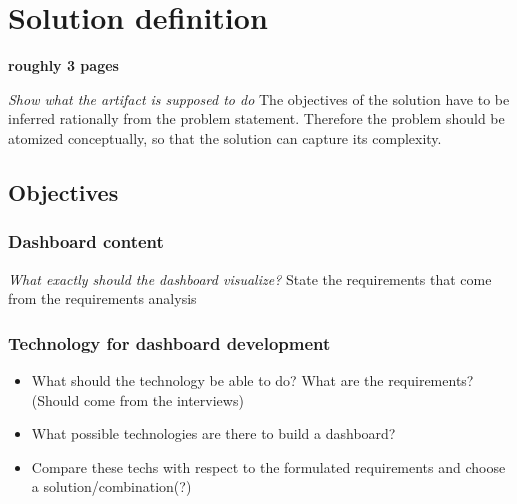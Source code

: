\chapter{Solution definition} \label{chapter:Solution}
\textbf{roughly 3 pages}

\textit{Show what the artifact is supposed to do}
The objectives of the solution have to be inferred rationally from the problem statement. Therefore the problem should be atomized conceptually, so that the solution can capture its complexity.



\section{Objectives}

\subsection{Dashboard content}
\textit{What exactly should the dashboard visualize?}
State the requirements that come from the requirements analysis

\subsection{Technology for dashboard development}
\begin{itemize}
    \item What should the technology be able to do? What are the requirements? (Should come from the interviews)
    \item What possible technologies are there to build a dashboard? 
    \item Compare these techs with respect to the formulated requirements and choose a solution/combination(?)
\end{itemize}

